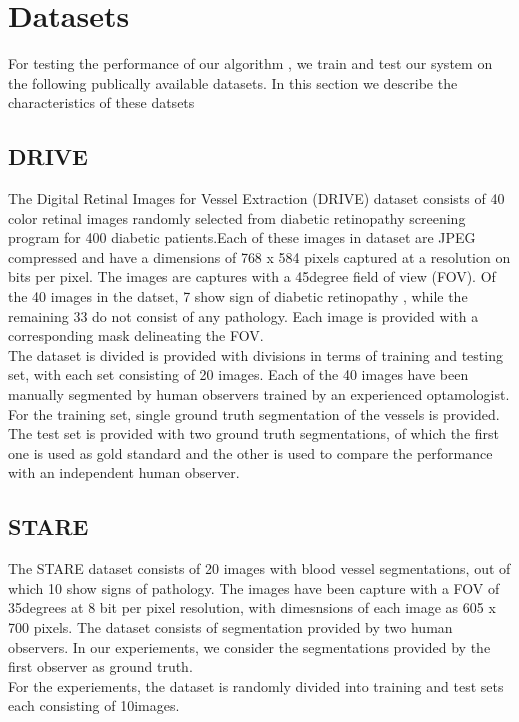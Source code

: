 \section{Datasets}
For testing the performance of our algorithm , we train and test our system on the following publically available datasets. In this section we describe the characteristics of these datsets

\subsection{DRIVE}
The Digital Retinal Images for Vessel Extraction (DRIVE) dataset consists of 40 color retinal images randomly selected from diabetic retinopathy screening program for 400 diabetic patients.Each of these images in dataset are JPEG compressed and have a dimensions of 768 x 584 pixels captured at a resolution on bits per pixel. The images are captures with a 45degree field of view (FOV).
Of the 40 images in the datset, 7 show sign of diabetic retinopathy , while the remaining 33 do not consist of any pathology. Each image is provided with a corresponding mask delineating the FOV.\\

The dataset is divided is provided with divisions in terms of training and testing set, with each set consisting of 20 images. Each of the 40 images have been manually segmented by human observers trained by an experienced optamologist. For the training set, single ground truth segmentation of the vessels is provided. The test set is provided with two ground truth segmentations, of which the first one is used as gold standard and the other is used to compare the performance with an independent human observer.\\

\subsection{STARE}
The STARE dataset consists of 20 images with blood vessel segmentations, out of which 10 show signs of pathology. The images have been capture with a FOV of 35degrees at 8 bit per pixel resolution, with dimesnsions of each image as 605 x 700 pixels. The dataset consists of segmentation provided by two human observers. In our experiements, we consider the segmentations provided by the first observer as ground truth.\\

For the experiements, the dataset is randomly divided into training and test sets each consisting of 10images.

